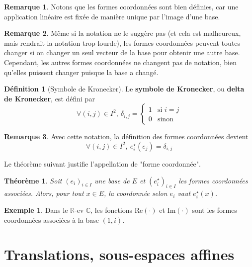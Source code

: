 \documentclass[french]{book}
\newcommand{\R}{\mathbb{R}}
\newcommand{\C}{\mathbb{C}}
\newcommand{\st}{^\star}
\theoremstyle{plain}
\newtheorem{thm}{Théorème}[chapter]
\theoremstyle{definition}
\newtheorem{dfn}{Définition}[chapter]
\newtheorem{exa}{Exemple}[chapter]
\newtheorem{rmq}{Remarque}[chapter]
\theoremstyle{remark}
\begin{document}
\begin{rmq}
	Notons que les formes coordonnées sont bien définies, car une application linéaire est fixée de manière unique par l'image d'une base.
\end{rmq}
\begin{rmq}
	Même si la notation ne le suggère pas (et cela est malheureux, mais rendrait la notation trop lourde), les formes coordonnées peuvent toutes changer si on changer un seul vecteur de la base pour obtenir une autre base. Cependant, les autres formes coordonnées ne changent pas de notation, bien qu'elles puissent changer puisque la base a changé.
\end{rmq}
\begin{dfn}[Symbole de Kronecker]
	Le \textbf{symbole de Kronecker}, ou \textbf{delta de Kronecker}, est défini par $$\forall(i,j)\in I^2,\ \delta_{i,j}=\left \{\begin{array}{ll}1&\text{si }i=j \\ 0&\text{sinon}\end{array}\right.$$ 
\end{dfn}
\begin{rmq}
	Avec cette notation, la définition des formes coordonnées devient $$\forall(i,j)\in I^2,\ e_i\st(e_j)=\delta_{i,j}$$
\end{rmq}
Le théorème suivant justifie l'appellation de "forme coordonnée".
\begin{thm}
	Soit $(e_i)_{i\in I}$ une base de $E$ et $(e_i\st)_{i\in I}$ les formes coordonnées associées. Alors, pour tout $x\in E$, la coordonnée selon $e_i$ vaut $e_i\st(x)$.
\end{thm}
\begin{exa}
	Dans le $\R$-ev $\C$, les fonctions $\text{Re}(\cdot)$ et $\text{Im}(\cdot)$ sont les formes coordonnées associées à la base $(1,i)$.
\end{exa}
\section{Translations, sous-espaces affines} %
\end{document}
